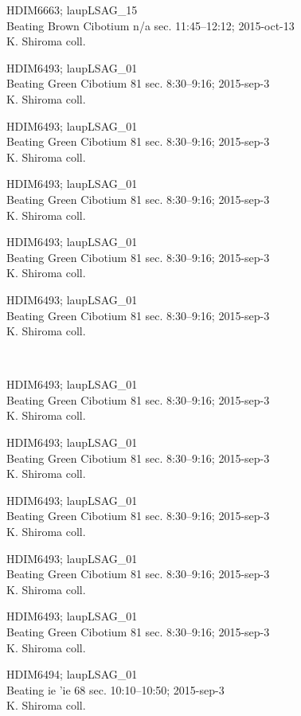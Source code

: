 \documentclass[2pt]{extarticle}
\begin{document}
\noindent
\parbox{0.16\textwidth}{\tiny \raggedright \rule[-0.3\baselineskip]{0pt}{10pt}HDIM6663; laupLSAG\_15\\ Beating Brown Cibotium n/a sec. 11:45--12:12; 2015-oct-13\\ K. Shiroma coll.}
\parbox{0.16\textwidth}{\tiny \raggedright \rule[-0.3\baselineskip]{0pt}{10pt}HDIM6493; laupLSAG\_01\\ Beating Green Cibotium 81 sec. 8:30--9:16; 2015-sep-3\\ K. Shiroma coll.}
\parbox{0.16\textwidth}{\tiny \raggedright \rule[-0.3\baselineskip]{0pt}{10pt}HDIM6493; laupLSAG\_01\\ Beating Green Cibotium 81 sec. 8:30--9:16; 2015-sep-3\\ K. Shiroma coll.}
\parbox{0.16\textwidth}{\tiny \raggedright \rule[-0.3\baselineskip]{0pt}{10pt}HDIM6493; laupLSAG\_01\\ Beating Green Cibotium 81 sec. 8:30--9:16; 2015-sep-3\\ K. Shiroma coll.}
\parbox{0.16\textwidth}{\tiny \raggedright \rule[-0.3\baselineskip]{0pt}{10pt}HDIM6493; laupLSAG\_01\\ Beating Green Cibotium 81 sec. 8:30--9:16; 2015-sep-3\\ K. Shiroma coll.}
\parbox{0.16\textwidth}{\tiny \raggedright \rule[-0.3\baselineskip]{0pt}{10pt}HDIM6493; laupLSAG\_01\\ Beating Green Cibotium 81 sec. 8:30--9:16; 2015-sep-3\\ K. Shiroma coll.} \\ 
\vspace{0.001in} 

\noindent
\parbox{0.16\textwidth}{\tiny \raggedright \rule[-0.3\baselineskip]{0pt}{10pt}HDIM6493; laupLSAG\_01\\ Beating Green Cibotium 81 sec. 8:30--9:16; 2015-sep-3\\ K. Shiroma coll.}
\parbox{0.16\textwidth}{\tiny \raggedright \rule[-0.3\baselineskip]{0pt}{10pt}HDIM6493; laupLSAG\_01\\ Beating Green Cibotium 81 sec. 8:30--9:16; 2015-sep-3\\ K. Shiroma coll.}
\parbox{0.16\textwidth}{\tiny \raggedright \rule[-0.3\baselineskip]{0pt}{10pt}HDIM6493; laupLSAG\_01\\ Beating Green Cibotium 81 sec. 8:30--9:16; 2015-sep-3\\ K. Shiroma coll.}
\parbox{0.16\textwidth}{\tiny \raggedright \rule[-0.3\baselineskip]{0pt}{10pt}HDIM6493; laupLSAG\_01\\ Beating Green Cibotium 81 sec. 8:30--9:16; 2015-sep-3\\ K. Shiroma coll.}
\parbox{0.16\textwidth}{\tiny \raggedright \rule[-0.3\baselineskip]{0pt}{10pt}HDIM6493; laupLSAG\_01\\ Beating Green Cibotium 81 sec. 8:30--9:16; 2015-sep-3\\ K. Shiroma coll.}
\parbox{0.16\textwidth}{\tiny \raggedright \rule[-0.3\baselineskip]{0pt}{10pt}HDIM6494; laupLSAG\_01\\ Beating ie 'ie 68 sec. 10:10--10:50; 2015-sep-3\\ K. Shiroma coll.} \\ 
\vspace{0.001in} 
\end{document}
